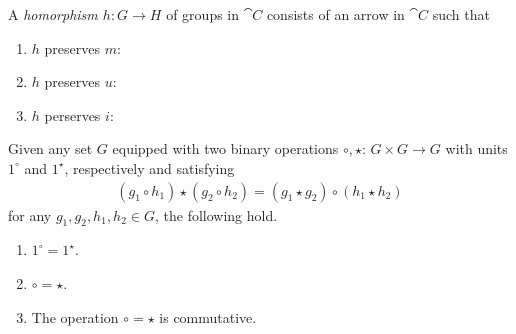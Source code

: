 \documentclass{article}
\begin{document}
\begin{definition}
    A \emph{homorphism $h:G\to H$} of groups in $\cat C$ consists of an arrow in $\cat C$
    such that
    \begin{enumerate}
        \item $h$ preserves $m$: \begin{center}
              \end{center}
        \item $h$ preserves $u$: \begin{center}
              \end{center}
        \item $h$ perserves $i$: \begin{center}
              \end{center}
    \end{enumerate}
\end{definition}

\begin{proposition}[Awodey p. 78]
    Given any set $G$ equipped with two binary operations $\circ,\star$:
    $G\times G\to G$ with units $1^\circ$ and $1^\star$, respectively and
    satisfying
    \begin{align*}
        (g_1 \circ h_1)\star (g_2\circ h_2) = (g_1\star g_2) \circ (h_1\star h_2)
    \end{align*}
    for any $g_1, g_2, h_1, h_2\in G$, the following hold.
    \begin{enumerate}
        \item $1^\circ = 1^\star$.
        \item $\circ = \star$.
        \item The operation $\circ = \star$ is commutative.
    \end{enumerate}
\end{proposition}
\end{document}
